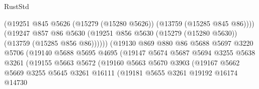 \begin{lexlean}{RustStd}
\begin{coremodule}
                                        (@19251
                                          @845
                                          @5626
                                          (@15279 (@15280 @5626))
                                          (@13759 (@15285 @845 @86))))
                                      (@19247
                                        @857
                                        @86
                                        @5630
                                        (@19251
                                          @856
                                          @5630
                                          (@15279 (@15280 @5630))
                                          (@13759 (@15285 @856 @86))))))
                                  (@19130
                                    @869
                                    @880
                                    @86
                                    @5688
                                    @5697
                                    @3220
                                    @5706
                                    (@19140
                                      @5688
                                      @5695
                                      @4695
                                      (@19147
                                        @5674
                                        @5687
                                        @5694
                                        @3255
                                        @5638
                                        @3261
                                        (@19155
                                          @5663
                                          @5672
                                          (@19160
                                            @5663
                                            @5670
                                            @3903
                                            (@19167
                                              @5662
                                              @5669
                                              @3255
                                              @5645
                                              @3261
                                              @16111
                                              (@19181
                                                @5655
                                                @3261
                                                @19192
                                                @16174
                                                @14730

\end{coremodule}
\end{lexlean}

